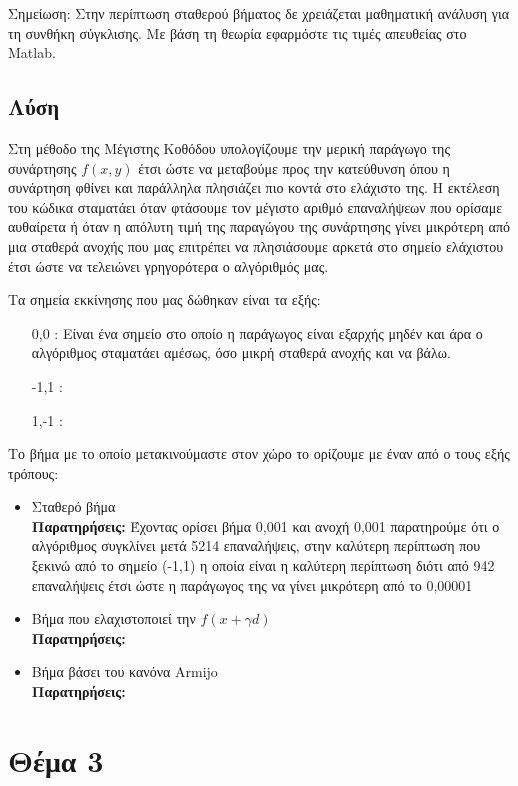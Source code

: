 \documentclass{report}
\begin{document}
Σημείωση: Στην περίπτωση σταθερού βήματος δε χρειάζεται μαθηματική ανάλυση για τη συνθήκη σύγκλισης. 
Με βάση τη θεωρία εφαρμόστε τις τιμές απευθείας στο Matlab.
\section{Λύση}
Στη μέθοδο της Μέγιστης Κοθόδου υπολογίζουμε την μερική παράγωγο της συνάρτησης $f(x,y)$
έτσι ώστε να μεταβούμε προς την κατεύθυνση όπου η συνάρτηση φθίνει και παράλληλα πλησιάζει
πιο κοντά στο ελάχιστο της. Η εκτέλεση του κώδικα σταματάει όταν φτάσουμε τον μέγιστο αριθμό
επαναλήψεων που ορίσαμε αυθαίρετα ή όταν η απόλυτη τιμή της παραγώγου της συνάρτησης γίνει 
μικρότερη από μια σταθερά ανοχής που μας επιτρέπει να πλησιάσουμε αρκετά στο σημείο ελάχιστου
έτσι ώστε να τελειώνει γρηγορότερα ο αλγόριθμός μας.

Τα σημεία εκκίνησης που μας δώθηκαν είναι τα εξής:
\begin{itemize}
    \item [0,0]: Είναι ένα σημείο στο οποίο η παράγωγος είναι εξαρχής μηδέν και άρα ο αλγόριθμος
    σταματάει αμέσως, όσο μικρή σταθερά ανοχής και να βάλω.
    \item [-1,1]: 
    \item [1,-1]:
\end{itemize}
Το βήμα με το οποίο μετακινούμαστε στον χώρο το ορίζουμε με έναν από ο τους εξής τρόπους:
\begin{itemize}
    \item Σταθερό βήμα\\
    \textbf{Παρατηρήσεις:} Έχοντας ορίσει βήμα 0,001 και ανοχή 0,001 παρατηρούμε ότι ο 
    αλγόριθμος συγκλίνει μετά 5214 επαναλήψεις, στην καλύτερη περίπτωση που ξεκινώ από το σημείο (-1,1)
    η οποία είναι η καλύτερη περίπτωση διότι  από 942 επαναλήψεις έτσι ώστε η παράγωγος της να γίνει μικρότερη από το 0,00001
    \item Βήμα που ελαχιστοποιεί την $f(x + γd)$\\
    \textbf{Παρατηρήσεις:} 
    \item Βήμα βάσει του κανόνα Armijo\\
    \textbf{Παρατηρήσεις:} 
\end{itemize}




\chapter{Θέμα 3}
\end{document}
